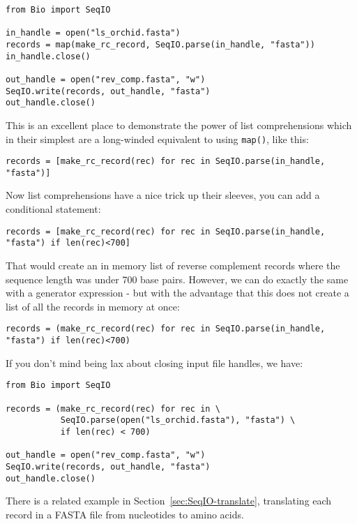 \documentclass{report}
\begin{document}
\begin{verbatim}
from Bio import SeqIO

in_handle = open("ls_orchid.fasta")
records = map(make_rc_record, SeqIO.parse(in_handle, "fasta"))
in_handle.close()

out_handle = open("rev_comp.fasta", "w")
SeqIO.write(records, out_handle, "fasta")
out_handle.close()
\end{verbatim}

This is an excellent place to demonstrate the power of list comprehensions which in their simplest are a long-winded equivalent to using \verb|map()|, like this:

\begin{verbatim}
records = [make_rc_record(rec) for rec in SeqIO.parse(in_handle, "fasta")]
\end{verbatim}

\noindent Now list comprehensions have a nice trick up their sleeves, you can add a conditional statement:

\begin{verbatim}
records = [make_rc_record(rec) for rec in SeqIO.parse(in_handle, "fasta") if len(rec)<700]
\end{verbatim}

That would create an in memory list of reverse complement records where the sequence length was under 700 base pairs. However, we can do exactly the same with a generator expression - but with the advantage that this does not create a list of all the records in memory at once:

\begin{verbatim}
records = (make_rc_record(rec) for rec in SeqIO.parse(in_handle, "fasta") if len(rec)<700)
\end{verbatim}

If you don't mind being lax about closing input file handles, we have:

\begin{verbatim}
from Bio import SeqIO

records = (make_rc_record(rec) for rec in \
           SeqIO.parse(open("ls_orchid.fasta"), "fasta") \
           if len(rec) < 700)

out_handle = open("rev_comp.fasta", "w")
SeqIO.write(records, out_handle, "fasta")
out_handle.close()
\end{verbatim}

There is a related example in Section~\ref{sec:SeqIO-translate}, translating each
record in a FASTA file from nucleotides to amino acids.
\end{document}
